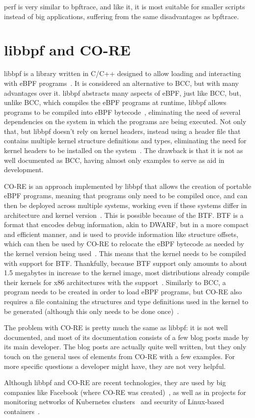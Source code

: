 perf is very similar to bpftrace, and like it, it is most suitable for smaller
scripts instead of big applications, suffering from the same disadvantages as
bpftrace.


\section{libbpf and CO-RE}

libbpf is a library written in C/C++ designed to allow loading and interacting
with eBPF programs~\cite{libbpf}. It is considered an alternative to \ac{BCC},
but with many advantages over it. libbpf abstracts many aspects of eBPF, just
like \ac{BCC}, but, unlike \ac{BCC}, which compiles the eBPF programs at
runtime, libbpf allows programs to be compiled into eBPF
bytecode~\cite{libbpf,contain}, eliminating the need of several dependencies on
the system in which the programs are being executed. Not only that, but libbpf
doesn't rely on kernel headers, instead using a header file that contains
multiple kernel structure definitions and types, eliminating the need for kernel
headers to be installed on the system~\cite{contain}. The drawback is that it is
not as well documented as \ac{BCC}, having almost only examples to serve as aid
in development.

\ac{CO-RE} is an approach implemented by libbpf that allows the creation of
portable eBPF programs, meaning that programs only need to be compiled once, and
can then be deployed across multiple systems, working even if these systems
differ in architecture and kernel version~\cite{coreref,fbslide}. This is
possible because of the \ac{BTF}. \ac{BTF} is a format that encodes debug
information, akin to \ac{DWARF}, but in a more compact and efficient manner, and
is used to provide information like structure offsets, which can then be used by
\ac{CO-RE} to relocate the eBPF bytecode as needed by the kernel version being
used~\cite{core}. This means that the kernel needs to be compiled with support
for \ac{BTF}. Thankfully, because \ac{BTF} support only amounts to about 1.5
megabytes in increase to the kernel image, most distributions already compile
their kernels for x86 architectures with the support~\cite{toolsfuture}.
Similarly to \ac{BCC}, a program needs to be created in order to load eBPF
programs, but \ac{CO-RE} also requires a file containing the structures and type
definitions used in the kernel to be generated (although this only needs to be
done once)~\cite{bootstrap}.

The problem with \ac{CO-RE} is pretty much the same as libbpf: it is not well
documented, and most of its documentation consists of a few blog posts made by
its main developer. The blog posts are actually quite well written, but they
only touch on the general uses of elements from \ac{CO-RE} with a few examples.
For more specific questions a developer might have, they are not very helpful.

Although libbpf and \ac{CO-RE} are recent technologies, they are used by big
companies like Facebook (where \ac{CO-RE} was created)~\cite{fbslide}, as well
as in projects for monitoring networks of Kubernetes clusters~\cite{kuber} and
security of Linux-based containers~\cite{sec}.
